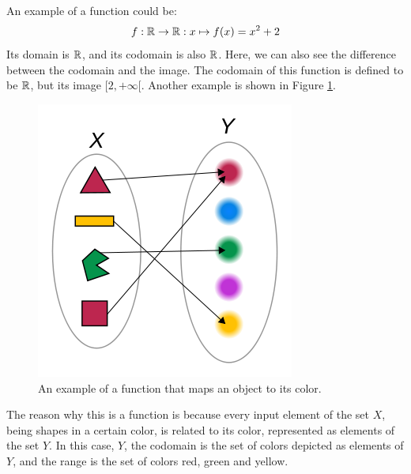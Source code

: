     An example of a function could be:
    \begin{equation}
        f: \mathbb{R} \rightarrow \mathbb{R}: x \mapsto f(x) = x^2 + 2
    \end{equation}
    Its domain is $\mathbb{R}$, and its codomain is also $\mathbb{R}$. Here, we can also see the difference between the codomain and the image. The codomain of this function is defined to be $\mathbb{R}$, but its image $[2, +\infty[$. Another example is shown in Figure \ref{fig:function_color}.
    \begin{figure}[H] \centering
        \includegraphics[scale=0.4]{images/function_color}
        \caption{An example of a function that maps an object to its color.}
        \label{fig:function_color}
    \end{figure}
    The reason why this is a function is because every input element of the set $X$, being shapes in a certain color, is related to its color, represented as elements of the set $Y$. In this case, $Y$, the codomain is the set of colors depicted as elements of $Y$, and the range is the set of colors red, green and yellow. \\

